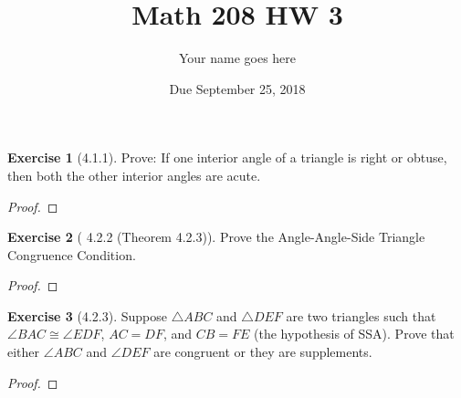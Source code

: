 \documentclass[12pt]{article}		%
\title{Math 208 HW 3}
\author{Your name goes here}
\date{Due September 25, 2018}
\theoremstyle{definition}
\newtheorem*{ex}{Exercise}
\begin{document}
	\maketitle
	
	
\begin{ex}[4.1.1]
	Prove: If one interior angle of a triangle is right or obtuse, then both the other interior angles are acute.
\end{ex}

\begin{proof} 
	
\end{proof}

\vspace{1in} %
	
	
	
		
\begin{ex}[ 4.2.2 (Theorem 4.2.3)]
	Prove the Angle-Angle-Side Triangle Congruence Condition.
\end{ex}

\begin{proof} 
	
\end{proof}

\vspace{1in} %



\begin{ex}[4.2.3]
	Suppose $\triangle ABC$ and $\triangle DEF$ are two triangles such that $\angle BAC \cong \angle EDF$, $AC = DF$, and $CB = FE$ (the hypothesis of SSA).  Prove that either $\angle ABC$ and $\angle DEF$ are congruent or they are supplements. 
\end{ex}

\begin{proof} 
	
\end{proof}


	
	
	
	
\end{document}
